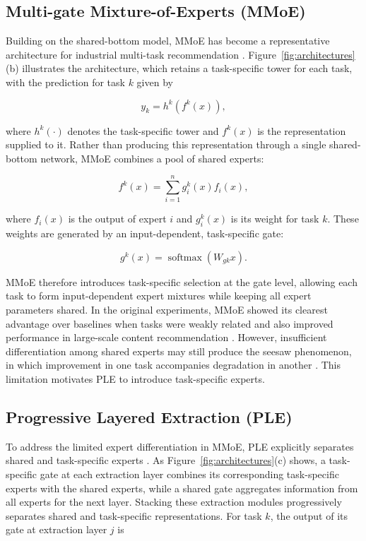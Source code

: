 \subsection{Multi-gate Mixture-of-Experts (MMoE)}

Building on the shared-bottom model, MMoE has become a representative architecture for industrial multi-task recommendation \citep{Ma2018MMoE}. Figure~\ref{fig:architectures}(b) illustrates the architecture, which retains a task-specific tower for each task, with the prediction for task $k$ given by

\begin{equation}
y_k = h^k\left(f^k(x)\right),
\label{eq}
\end{equation}

where $h^k(\cdot)$ denotes the task-specific tower and $f^k(x)$ is the representation supplied to it. Rather than producing this representation through a single shared-bottom network, MMoE combines a pool of shared experts:

\begin{equation}
f^k(x)
=
\sum_{i=1}^{n} g_i^k(x)f_i(x),
\label{eq}
\end{equation}

where $f_i(x)$ is the output of expert $i$ and $g_i^k(x)$ is its weight for task $k$. These weights are generated by an input-dependent, task-specific gate:

\begin{equation}
g^k(x)
=
\operatorname{softmax}\left(W_{gk}x\right).
\label{eq}
\end{equation}

MMoE therefore introduces task-specific selection at the gate level, allowing each task to form input-dependent expert mixtures while keeping all expert parameters shared. In the original experiments, MMoE showed its clearest advantage over baselines when tasks were weakly related and also improved performance in large-scale content recommendation \citep{Ma2018MMoE}. However, insufficient differentiation among shared experts may still produce the seesaw phenomenon, in which improvement in one task accompanies degradation in another \citep{Tang2020PLE}. This limitation motivates PLE to introduce task-specific experts.

\subsection{Progressive Layered Extraction (PLE)}
To address the limited expert differentiation in MMoE, PLE explicitly separates shared and task-specific experts \citep{Tang2020PLE}. As Figure~\ref{fig:architectures}(c) shows, a task-specific gate at each extraction layer combines its corresponding task-specific experts with the shared experts, while a shared gate aggregates information from all experts for the next layer. Stacking these extraction modules progressively separates shared and task-specific representations. For task $k$, the output of its gate at extraction layer $j$ is

